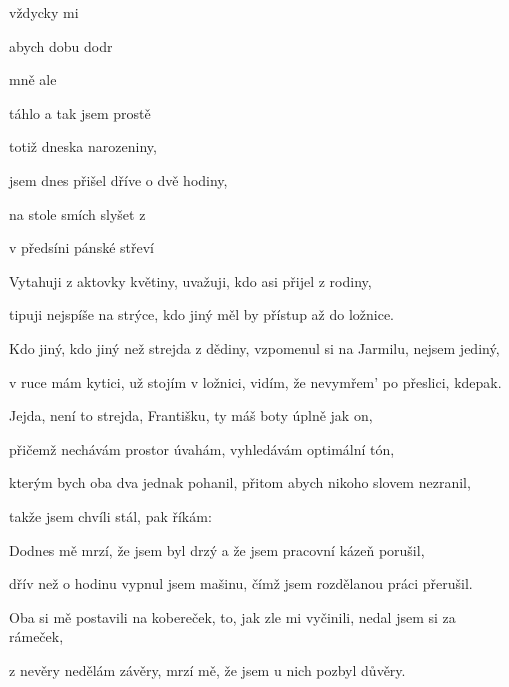 

\zs
{} vždycky mi 

abych  dobu dodr 

 mně ale 

táhlo  a tak jsem prostě 

 totiž dneska narozeniny,

 jsem dnes přišel dříve o dvě hodiny,

na stole  smích slyšet z 

v předsíni  pánské střeví 
\ks

\zs
Vytahuji z aktovky květiny, uvažuji, kdo asi přijel z rodiny,

tipuji nejspíše na strýce, kdo jiný měl by přístup až do ložnice.

Kdo jiný, kdo jiný než strejda z dědiny, vzpomenul si na Jarmilu, nejsem jediný,

v ruce mám kytici, už stojím v ložnici, vidím, že nevymřem' po přeslici, kdepak.
\ks

\zs
Jejda, není to strejda, Františku, ty máš boty úplně jak on,

přičemž nechávám prostor úvahám, vyhledávám optimální tón,

kterým bych oba dva jednak pohanil, přitom abych nikoho slovem nezranil,

takže jsem chvíli stál, pak říkám: 
\ks

\zs
Dodnes mě mrzí, že jsem byl drzý a že jsem pracovní kázeň porušil,

dřív než o hodinu vypnul jsem mašinu, čímž jsem rozdělanou práci přerušil.

Oba si mě postavili na kobereček, to, jak zle mi vyčinili, nedal jsem si za rámeček,

z nevěry nedělám závěry, mrzí mě, že jsem u nich pozbyl důvěry.
\ks

\kp
